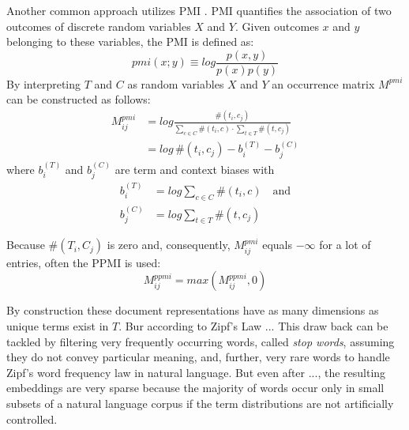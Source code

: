 Another common approach utilizes \acl{PMI} \autocite{church_word_1990}. \acf{PMI} quantifies the association of two outcomes of discrete random variables $X$ and $Y$. Given outcomes $x$ and $y$ belonging to these variables, the \ac{PMI} is defined as:
\begin{equation}
	pmi(x;y) \equiv log\frac{p(x,y)}{p(x)p(y)}
\end{equation}
By interpreting $T$ and $C$ as random variables $X$ and $Y$ an occurrence matrix $M^{pmi}$ 
can be constructed as follows:
\begin{equation}
\begin{split}
M^{pmi}_{ij} & = log\frac{\#(t_i, c_j)}{\sum\limits_{c \in C}\#(t_i, c) \cdot \sum\limits_{t \in T}\#(t,c_j)} \\
 & = log\,\#(t_i, c_j) - b_i^{(T)} - b_j^{(C)}
\end{split}
\end{equation}
where $b_i^{(T)}$ and $b_j^{(C)}$ are term and context biases with
\begin{equation} \label{eq:m_pmi}
\begin{split}
b_i^{(T)} & = log \sum\limits_{c \in C}\#(t_i, c) \quad \text{and} \\
b_j^{(C)} & = log \sum\limits_{t \in T}\#(t,c_j)
\end{split}
\end{equation}

Because $\#(T_i, C_j)$ is zero and, consequently, $M^{pmi}_{ij}$ equals $-\infty$ for a lot of entries, often the \ac{PPMI} \autocite{niwa_co-occurrence_1994} is used:
\begin{equation}
M^{ppmi}_{ij} = max(M^{ppmi}_{ij}, 0)
\end{equation}

By construction these document representations have as many dimensions as unique terms exist in $T$. Bur according to Zipf's Law ... This draw back can be tackled by filtering very frequently occurring words, called \textit{stop words}, assuming they do not convey particular meaning, and, further, very rare words to handle Zipf's word frequency law in natural language. But even after ..., the resulting embeddings are very sparse because the majority of words occur only in small subsets of a natural language corpus if the term distributions are not artificially controlled. %

